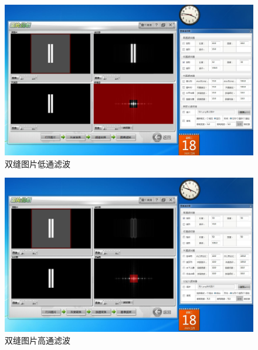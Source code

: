\documentclass[11pt]{article}
\begin{document}
\begin{enumerate}
    \begin{figure}[H]
        \centering
        \includegraphics[width=15cm]{Fig/图15 双缝图片低通滤波.JPG}
        \caption{双缝图片低通滤波}
    \end{figure}
    \begin{figure}[H]
        \centering
        \includegraphics[width=15cm]{Fig/图16 双缝图片高通滤波.JPG}
        \caption{双缝图片高通滤波}
    \end{figure}


\end{enumerate}
\end{document}

